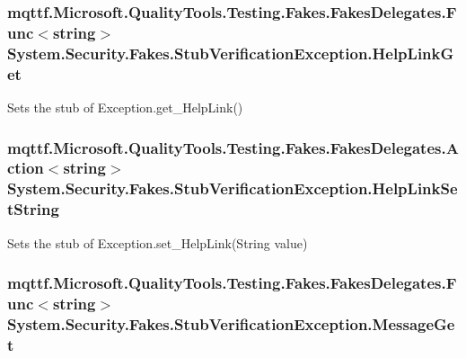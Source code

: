 \hypertarget{class_system_1_1_security_1_1_fakes_1_1_stub_verification_exception_aedb6bf95fed599dd6fb95b1191116709}{
\subsubsection[{Help\-Link\-Get}]{\setlength{\rightskip}{0pt plus 5cm}mqttf.\-Microsoft.\-Quality\-Tools.\-Testing.\-Fakes.\-Fakes\-Delegates.\-Func$<$string$>$ System.\-Security.\-Fakes.\-Stub\-Verification\-Exception.\-Help\-Link\-Get}}\label{class_system_1_1_security_1_1_fakes_1_1_stub_verification_exception_aedb6bf95fed599dd6fb95b1191116709}


Sets the stub of Exception.\-get\-\_\-\-Help\-Link()

\hypertarget{class_system_1_1_security_1_1_fakes_1_1_stub_verification_exception_a971c4f93d3e5ebeccbe8b41854f1ef2e}{
\subsubsection[{Help\-Link\-Set\-String}]{\setlength{\rightskip}{0pt plus 5cm}mqttf.\-Microsoft.\-Quality\-Tools.\-Testing.\-Fakes.\-Fakes\-Delegates.\-Action$<$string$>$ System.\-Security.\-Fakes.\-Stub\-Verification\-Exception.\-Help\-Link\-Set\-String}}\label{class_system_1_1_security_1_1_fakes_1_1_stub_verification_exception_a971c4f93d3e5ebeccbe8b41854f1ef2e}


Sets the stub of Exception.\-set\-\_\-\-Help\-Link(\-String value)

\hypertarget{class_system_1_1_security_1_1_fakes_1_1_stub_verification_exception_a10be0a886050a9bcf23066b71823919b}{
\subsubsection[{Message\-Get}]{\setlength{\rightskip}{0pt plus 5cm}mqttf.\-Microsoft.\-Quality\-Tools.\-Testing.\-Fakes.\-Fakes\-Delegates.\-Func$<$string$>$ System.\-Security.\-Fakes.\-Stub\-Verification\-Exception.\-Message\-Get}}\label{class_system_1_1_security_1_1_fakes_1_1_stub_verification_exception_a10be0a886050a9bcf23066b71823919b}


